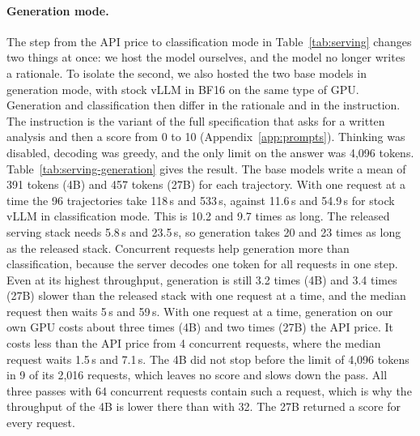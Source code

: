 \paragraph{Generation mode.}
The step from the API price to classification mode in Table~\ref{tab:serving} changes two things at once: we host the model ourselves, and the model no longer writes a rationale.
To isolate the second, we also hosted the two base models in generation mode, with stock vLLM in BF16 on the same type of GPU.
Generation and classification then differ in the rationale and in the instruction.
The instruction is the variant of the full specification that asks for a written analysis and then a score from 0 to 10 (Appendix~\ref{app:prompts}).
Thinking was disabled, decoding was greedy, and the only limit on the answer was 4,096 tokens.
Table~\ref{tab:serving-generation} gives the result.
The base models write a mean of 391 tokens (4B) and 457 tokens (27B) for each trajectory.
With one request at a time the 96 trajectories take 118\,s and 533\,s, against 11.6\,s and 54.9\,s for stock vLLM in classification mode.
This is 10.2 and 9.7 times as long.
The released serving stack needs 5.8\,s and 23.5\,s, so generation takes 20 and 23 times as long as the released stack.
Concurrent requests help generation more than classification, because the server decodes one token for all requests in one step.
Even at its highest throughput, generation is still 3.2 times (4B) and 3.4 times (27B) slower than the released stack with one request at a time, and the median request then waits 5\,s and 59\,s.
With one request at a time, generation on our own GPU costs about three times (4B) and two times (27B) the API price.
It costs less than the API price from 4 concurrent requests, where the median request waits 1.5\,s and 7.1\,s.
The 4B did not stop before the limit of 4,096 tokens in 9 of its 2,016 requests, which leaves no score and slows down the pass.
All three passes with 64 concurrent requests contain such a request, which is why the throughput of the 4B is lower there than with 32.
The 27B returned a score for every request.

